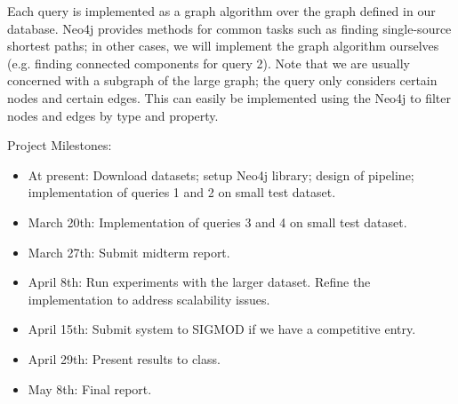 \documentclass{article}
\begin{document}
Each query is implemented as a graph algorithm over the graph defined
in our database.  Neo4j provides methods for common tasks such as
finding single-source shortest paths; in other cases, we will
implement the graph algorithm ourselves (e.g. finding connected 
components for query 2).  Note that we are usually concerned with a 
subgraph of the large graph; the query only considers
certain nodes and certain edges. This can easily be implemented using
the Neo4j to filter nodes and edges by type and property.

Project Milestones:
\begin{itemize}
\item At present: Download datasets; setup Neo4j library;
  design of pipeline; implementation of queries 1 and 2 on small test dataset.
\item March 20th: Implementation of queries 3 and 4 on small test dataset.
\item March 27th: Submit midterm report.
\item April 8th:  Run experiments with the larger dataset. Refine the implementation to address scalability issues.
\item April 15th: Submit system to SIGMOD if we have a competitive entry.
\item April 29th: Present results to class.
\item May 8th: Final report.
\end{itemize}



\end{document}
